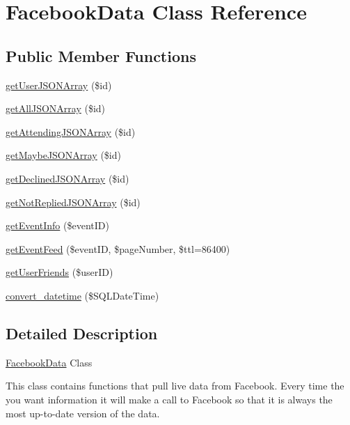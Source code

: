 \hypertarget{class_facebook_data}{
\section{FacebookData Class Reference}
\label{class_facebook_data}
}
\subsection*{Public Member Functions}
\begin{DoxyCompactItemize}
\item 
\hyperlink{class_facebook_data_aeef080cc7b907fda248d93c5ee1aed48}{getUserJSONArray} (\$id)
\item 
\hyperlink{class_facebook_data_a2e1eb25350e7bd9725b2e582fcf2037a}{getAllJSONArray} (\$id)
\item 
\hyperlink{class_facebook_data_aaa12cd22a15483a707d39d4a34369c36}{getAttendingJSONArray} (\$id)
\item 
\hyperlink{class_facebook_data_a7d83e3ac178e6144a7953c7970a0ffaf}{getMaybeJSONArray} (\$id)
\item 
\hyperlink{class_facebook_data_a0d47b98d28abc9edd02a7091c5b36cf5}{getDeclinedJSONArray} (\$id)
\item 
\hyperlink{class_facebook_data_a690c796963e3f659abb6eb557c6ef2d0}{getNotRepliedJSONArray} (\$id)
\item 
\hyperlink{class_facebook_data_a0e0cf92725f8613b788fc97e485acd5e}{getEventInfo} (\$eventID)
\item 
\hyperlink{class_facebook_data_a78d42466d87e3f2fbca288f7c3151d07}{getEventFeed} (\$eventID, \$pageNumber, \$ttl=86400)
\item 
\hyperlink{class_facebook_data_a1c7dc11fa368696b1ae2b523b3392bb1}{getUserFriends} (\$userID)
\item 
\hyperlink{class_facebook_data_ac1f0b24277db635b08a18d7c9cd6c193}{convert\_\-datetime} (\$SQLDateTime)
\end{DoxyCompactItemize}


\subsection{Detailed Description}
\hyperlink{class_facebook_data}{FacebookData} Class

This class contains functions that pull live data from Facebook. Every time the you want information it will make a call to Facebook so that it is always the most up-\/to-\/date version of the data.


